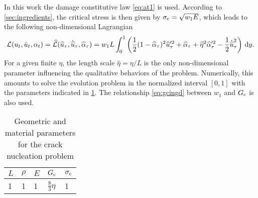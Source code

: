 In this work the damage constitutive law \eqref{eq:at1} is used. According to \cref{sec:ingredients}, the critical stress is then given by $\sigma_{\mathrm{c}}=\sqrt{w_1E}$, which leads to the following non-dimensional Lagrangian
\begin{equation} \label{eq:nondimensionalL}
\mathcal{L}(u_t,\dot{u}_t,\alpha_t)=\widehat{\mathcal{L}}(\widehat{u}_\tau,\dot{\widehat{u}}_\tau,\widehat{\alpha}_\tau)=w_1L\int_0^1\left(\frac{1}{2}(1-\widehat{\alpha}_\tau)^2\widehat{u}_\tau'^2+\widehat{\alpha}_\tau+\widehat{\eta}^2\widehat{\alpha}_\tau'^2-\frac{1}{2}\dot{\widehat{u}}_\tau^2\right)\,\mathrm{d}y.
\end{equation}
For a given finite $\eta$, the length scale $\widehat{\eta}=\eta/L$ is the only non-dimensional parameter influencing the qualitative behaviors of the problem. Numerically, this amounts to solve the evolution problem in the normalized interval $[0,1]$ with the parameters indicated in \cref{tab:para1d}. The relationship \eqref{eq:gcingd} between $w_1$ and $G_\mathrm{c}$ is also used.
\begin{table}[htbp]
\centering
\caption{Geometric and material parameters for the crack nucleation problem} \label{tab:para1d}
\begin{tabular}{lllll} \toprule
$L$ & $\rho$ & $E$ & $G_\mathrm{c}$ & $\sigma_{\mathrm{c}}$ \\ \midrule
1 & 1 & 1 & $\frac{8}{3}\eta$ & 1 \\ \bottomrule
\end{tabular}
\end{table}

